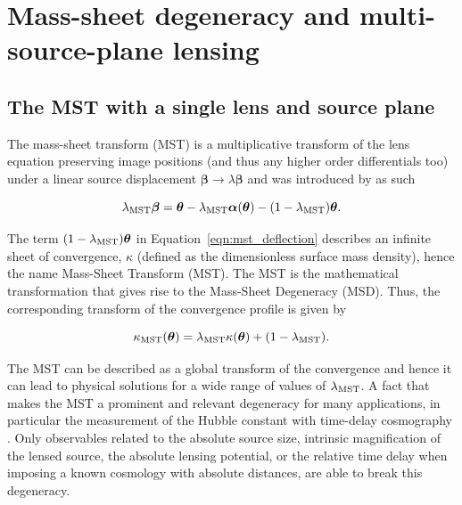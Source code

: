 \documentclass[a4paper,11pt]{article}
\begin{document}


\section{Mass-sheet degeneracy and multi-source-plane lensing}\label{sec:msd}

\subsection{The MST with a single lens and source plane}

The mass-sheet transform (MST) is a multiplicative transform of the lens equation preserving image positions (and thus any higher order differentials too) under a linear source displacement $\boldsymbol{\beta} \rightarrow \lambda\boldsymbol{\beta}$ and was introduced by \cite{Falco:1985, Gorenstein:1988} as such

\begin{equation} \label{eqn:mst_deflection}
    \lambda_{\rm MST} \boldsymbol{\beta} = \boldsymbol{\theta} - \lambda_{\rm MST} \boldsymbol{\alpha}(\boldsymbol{\theta}) - (1 - \lambda_{\rm MST}) \boldsymbol{\theta}.
\end{equation}

The term $(1 - \lambda_{\rm MST}) \boldsymbol{\theta}$ in Equation~\ref{eqn:mst_deflection} describes an infinite sheet of convergence, $\kappa$ (defined as the dimensionless surface mass density), hence the name Mass-Sheet Transform (MST). The MST is the mathematical transformation that gives rise to the Mass-Sheet Degeneracy (MSD).
Thus, the corresponding transform of the convergence profile is given by

\begin{equation}
  \kappa_{\rm MST}(\boldsymbol{\theta}) =  \lambda_{\rm MST} \kappa(\boldsymbol{\theta}) + (1 - \lambda_{\rm MST}).    
\end{equation}


The MST can be described as a global transform of the convergence and hence it can lead to physical solutions for a wide range of values of $\lambda_{\rm MST}$. A fact that makes the MST a prominent and relevant degeneracy for many applications, in particular the measurement of the Hubble constant with time-delay cosmography \citep{SchneiderSluse:2013, Birrer:2016, Sonnenfeld:2018, Kochanek:2020}.
Only observables related to the absolute source size, intrinsic magnification of the lensed source, the absolute lensing potential, or the relative time delay when imposing a known cosmology with absolute distances, are able to break this degeneracy.
\end{document}
